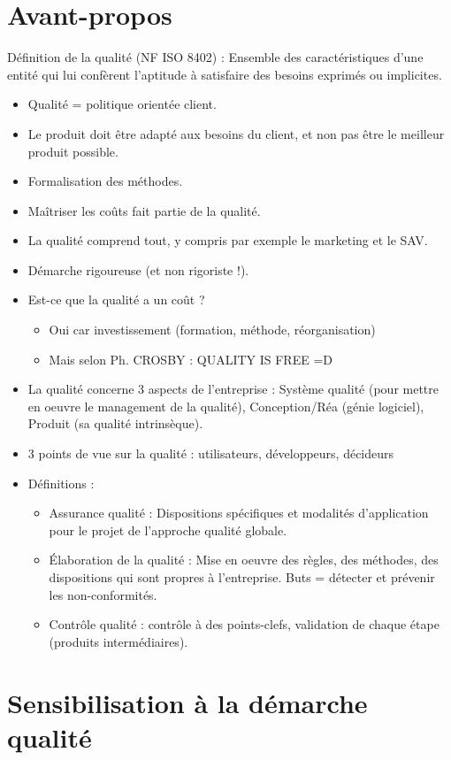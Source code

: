 \chapter*{Avant-propos}
Définition de la qualité (NF ISO 8402) : Ensemble des caractéristiques d’une entité qui lui confèrent l'aptitude à satisfaire des besoins exprimés ou implicites. \\
\begin{itemize}
\item Qualité = politique orientée client. 
\item Le produit doit être adapté aux besoins du client, et non pas être le meilleur produit possible. 
\item Formalisation des méthodes. 
\item Maîtriser les coûts fait partie de la qualité. 
\item La qualité comprend tout, y compris par exemple le marketing et le SAV. 
\item Démarche rigoureuse (et non rigoriste !). 
\item Est-ce que la qualité a un coût ? 
\begin{itemize}
\item Oui car investissement (formation, méthode, réorganisation)
\item Mais selon Ph. CROSBY : \og QUALITY IS FREE \fg =D
\end{itemize}
\item La qualité concerne 3 aspects de l'entreprise : Système qualité (pour mettre en oeuvre le management de la qualité), Conception/Réa (génie logiciel), Produit (sa qualité intrinsèque). 
\item 3 points de vue sur la qualité : utilisateurs, développeurs, décideurs
\item Définitions : 
\begin{itemize}
\item Assurance qualité : Dispositions spécifiques et modalités d'application pour le projet de l'approche qualité globale. 
\item Élaboration de la qualité : Mise en oeuvre des règles, des méthodes, des dispositions qui sont propres à l'entreprise. Buts = détecter et prévenir les non-conformités. 
\item Contrôle qualité : contrôle à des points-clefs, validation de chaque étape (produits intermédiaires). 
\end{itemize}
\end{itemize}

\chapter{Sensibilisation à la démarche qualité}
